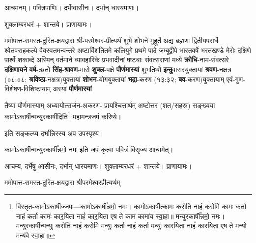 
\setlength{\parindent}{0pt}

\newcommand{\sep}{\hspace{-0.5ex}{\small$\circ$}\hspace{0.5ex}}
\newcommand{\yutithyadi}{\textbf{क्रोधि}-नाम-संवत्सरे    \textbf{दक्षिणायने} \textbf{वर्ष}-ऋतौ   \textbf{सिंह}-\textbf{श्रावण}-मासे  \textbf{शुक्ल}-पक्षे    \textbf{पौर्णमास्यां} शुभतिथौ   \textbf{इन्दु}\-वासर\-युक्तायां \textbf{श्रवण}-नक्षत्र (०८:०८; \textbf{श्रविष्ठा}-नक्षत्र)\-युक्तायां   \textbf{शोभन}-योग\-युक्तायां    \textbf{भद्रा}-करण (१३:३२; \textbf{बव}-करण)\-युक्तायाम् एवं-गुण-विशेषण-विशिष्टायाम्     अस्यां \textbf{पौर्णमास्यां}}
\newcommand{\instruct}[2]{#1}
\begingroup


आचमनम्। पवित्रपाणिः। दर्भेष्वासीनः। दर्भान् धारयमाणः।

शुक्लाम्बरधरं + शान्तये। प्राणायामः।

ममोपात्त-समस्त-दुरित-क्षयद्वारा श्री-परमेश्वर-प्रीत्यर्थं शुभे शोभने मुहूर्ते अद्य ब्रह्मणः
द्वितीयपरार्धे श्वेतवराहकल्पे वैवस्वतमन्वन्तरे अष्टाविंशतितमे कलियुगे प्रथमे पादे
जम्बूद्वीपे भारतवर्षे भरतखण्डे मेरोः दक्षिणे पार्श्वे शकाब्दे अस्मिन् वर्तमाने व्यावहारिके
 प्रभवादीनां षष्ट्याः संवत्सराणां मध्ये
\yutithyadi

तैष्यां पौर्णमास्याम् अध्यायोत्सर्जन-अकरण- प्रायश्चित्तार्थम् अष्टोत्तर (शत/सहस्र) सङ्ख्यया कामोऽकार्षीन्मन्युरकार्षीदिति\footnote{विस्तृत-कामोऽकार्षीज्जपः---कामोऽकार्\mbox{}षी᳚न्नमो॒ नमः। 
 कामोऽकार्\mbox{}षीत्कामः करोति नाहं करोमि कामः कर्ता नाहं कर्ता कामः॑ कार॒यिता नाहं॑ कार॒यिता एष ते काम कामा॑य स्वा॒हा॥ मन्युरकार्\mbox{}षी᳚न्नमो॒ नमः। 
मन्युरकार्\mbox{}षीन्मन्युः करोति नाहं करोमि मन्युः कर्ता नाहं कर्ता मन्युः॑ कार॒यिता नाहं॑ कार॒यिता एष ते मन्यो मन्य॑वे स्वा॒हा॥} महा\-मन्त्र\-जपं करिष्ये।

\instruct{इति सङ्कल्प्य दर्भान्निरस्य अप उपस्पृश्य।}{என்று ஸங்கல்பம் செய்து கொண்டு தர்பைகளை கீழே போட்டுவிட்டு ஜலத்தை தொடவும்.}

\instruct{कामोऽकार्षीन्मन्युरकार्षी᳚न्नमो॒ नमः इति जपं कृत्वा पवित्रं विसृज्य आचामेत्।}{காமோகார்ஷீத் மன்யுரகார்ஷீன்னமோ நம: என்று ஜபித்து முடிவில் ப்ராணாயாமம் செய்து உபஸ்தானம் செய்யவும். பவித்ரத்தை விஸர்ஜனம் செய்து ஆசமனம் செய்யவும்.}


आचम्य, दर्भेषु आसीनः, दर्भान् धारयमाणः। शुक्लाम्बरधरं + शान्तये। प्राणायामः।

ममोपात्त-समस्त-दुरित-क्षयद्वारा श्रीपरमेश्वरप्रीत्यर्थम्

